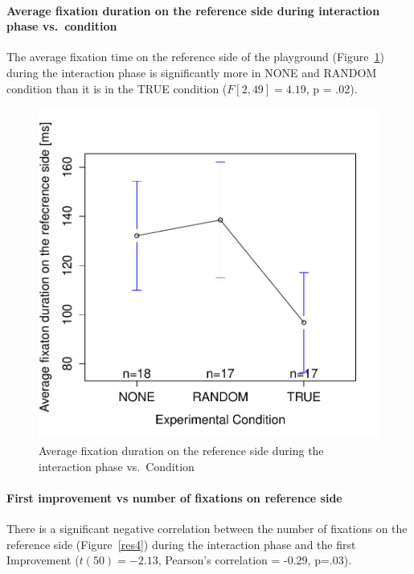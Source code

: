 \documentclass{sig-alternate}
\begin{document}
\paragraph{Average fixation duration on the reference side during interaction
phase vs.~condition}

The average fixation time on the reference side of the playground
(Figure~\ref{res3}) during the interaction phase is significantly more in {\sf NONE}
and {\sf RANDOM} condition than it is in the {\sf TRUE} condition ($F[2,49]=4.19$,
p = .02).

\begin{figure}[h!]
    \centering
    \includegraphics[width=0.8\linewidth]{meanPlotFixReference}
    \caption{Average fixation duration on the reference side during the
    interaction phase vs.~Condition}
    \label{res3}
\end{figure}

\paragraph{First improvement vs number of fixations on reference side}

There is a significant negative correlation between the number of
fixations on the reference side (Figure~\ref{res4}) during the interaction phase
and the first Improvement ($t(50)=-2.13$, Pearson's correlation = -0.29, p=.03).
\end{document}
